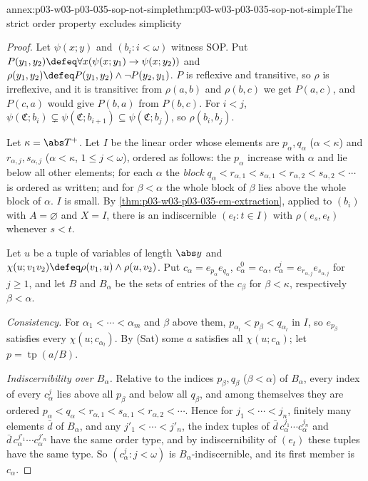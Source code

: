 \begin{annexitem}{annex:p03-w03-p03-035-sop-not-simple}{thm:p03-w03-p03-035-sop-not-simple}{The strict order property excludes simplicity}
\begin{proof}
Let \(\psi(x;y)\) and \((b_i:i<\omega)\) witness SOP.  Put
\(P(y_1,y_2)\defeq\forall x(\psi(x;y_1)\rightarrow\psi(x;y_2))\) and
\(\rho(y_1,y_2)\defeq P(y_1,y_2)\wedge\neg P(y_2,y_1)\).  \(P\) is reflexive
and transitive, so \(\rho\) is irreflexive, and it is transitive: from
\(\rho(a,b)\) and \(\rho(b,c)\) we get \(P(a,c)\), and \(P(c,a)\) would give
\(P(b,a)\) from \(P(b,c)\).  For \(i<j\),
\(\psi(\mathfrak C;b_i)\subsetneq\psi(\mathfrak C;b_{i+1})\subseteq
\psi(\mathfrak C;b_j)\), so \(\rho(b_i,b_j)\).

Let \(\kappa=\abs T^+\).  Let \(I\) be the linear order whose elements are
\(p_\alpha,q_\alpha\) (\(\alpha<\kappa\)) and \(r_{\alpha,j},s_{\alpha,j}\)
(\(\alpha<\kappa\), \(1\leq j<\omega\)), ordered as follows: the \(p_\alpha\)
increase with \(\alpha\) and lie below all other elements; for each \(\alpha\)
the \emph{block} \(q_\alpha<r_{\alpha,1}<s_{\alpha,1}<r_{\alpha,2}<
s_{\alpha,2}<\cdots\) is ordered as written; and for \(\beta<\alpha\) the whole
block of \(\beta\) lies above the whole block of \(\alpha\).  \(I\) is small.
By \cref{thm:p03-w03-p03-035-em-extraction}, applied to \((b_i)\) with
\(A=\varnothing\) and \(X=I\), there is an indiscernible
\((e_t:t\in I)\) with \(\rho(e_s,e_t)\) whenever \(s<t\).

Let \(u\) be a tuple of variables of length \(\abs y\) and
\(\chi(u;v_1v_2)\defeq\rho(v_1,u)\wedge\rho(u,v_2)\).  Put
\(c_\alpha=e_{p_\alpha}e_{q_\alpha}\), \(c^0_\alpha=c_\alpha\),
\(c^j_\alpha=e_{r_{\alpha,j}}e_{s_{\alpha,j}}\) for \(j\geq1\), and let \(B\) and
\(B_\alpha\) be the sets of entries of the \(c_\beta\) for \(\beta<\kappa\),
respectively \(\beta<\alpha\).

\emph{Consistency.}  For \(\alpha_1<\cdots<\alpha_m\) and \(\beta\) above
them, \(p_{\alpha_l}<p_\beta<q_{\alpha_l}\) in \(I\), so \(e_{p_\beta}\) satisfies
every \(\chi(u;c_{\alpha_l})\).  By (Sat) some \(a\) satisfies all
\(\chi(u;c_\alpha)\); let \(p=\operatorname{tp}(a/B)\).

\emph{Indiscernibility over \(B_\alpha\).}  Relative to the indices
\(p_\beta,q_\beta\) (\(\beta<\alpha\)) of \(B_\alpha\), every index of every
\(c^j_\alpha\) lies above all \(p_\beta\) and below all \(q_\beta\), and among
themselves they are ordered
\(p_\alpha<q_\alpha<r_{\alpha,1}<s_{\alpha,1}<r_{\alpha,2}<\cdots\).  Hence for
\(j_1<\cdots<j_n\), finitely many elements \(\bar d\) of \(B_\alpha\), and any
\(j'_1<\cdots<j'_n\), the index tuples of \(\bar d\,c^{j_1}_\alpha\cdots
c^{j_n}_\alpha\) and \(\bar d\,c^{j'_1}_\alpha\cdots c^{j'_n}_\alpha\) have the
same order type, and by indiscernibility of \((e_t)\) these tuples have the
same type.  So \((c^j_\alpha:j<\omega)\) is \(B_\alpha\)-indiscernible, and its
first member is \(c_\alpha\).


\end{proof}
\end{annexitem}
